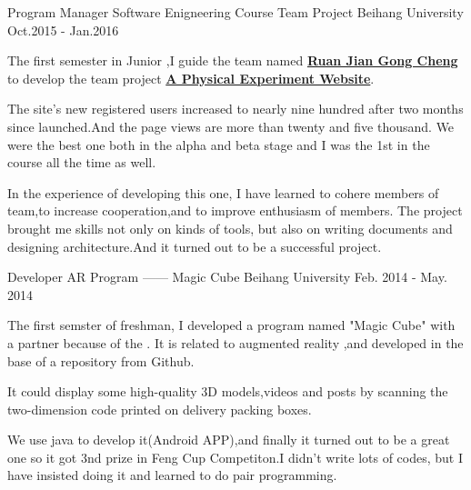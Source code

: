 


\begin{cventries}

\cventry
{Program Manager} %
{Software Enigneering Course Team Project} %
{Beihang University} %
{Oct.2015 - Jan.2016} %
{ %
\begin{cvitems}
\item {The first semester in Junior ,I guide the team named \href{http://www.cnblogs.com/buaase}{\textbf{Ruan Jian Gong Cheng}} to develop the team project \href{http://buaaphylab.com/}{\textbf{A Physical Experiment Website}}.}
\item {The site's new registered users increased to nearly nine hundred after two months since launched.And the page views are more than twenty and five thousand. We were the best one both in the alpha and beta stage and I was the 1st in the course all the time as well.}
\item {In the experience of developing this one, I have learned to cohere members of team,to increase cooperation,and to improve enthusiasm of members. The project brought me skills not only on kinds of tools, but also on writing documents and designing architecture.And it turned out to be a successful project.}
\end{cvitems}
}

\cventry
{Developer} %
{AR Program —— Magic Cube} %
{Beihang University} %
{Feb. 2014 - May. 2014 } %
{ %
	\begin{cvitems}
		\item {The first semster of freshman, I developed a program named "Magic Cube" with a partner because of the . It is related to augmented reality ,and developed in the base of a repository from Github.}
		\item {It could display some high-quality 3D models,videos and posts by scanning the two-dimension code printed on delivery packing boxes. }
		\item {We use java to develop it(Android APP),and finally it turned out to be a great one so it got 3nd prize in Feng Cup Competiton.I didn't write lots of codes, but I have insisted doing it and learned to do pair programming.}
	\end{cvitems}
}

\end{cventries}